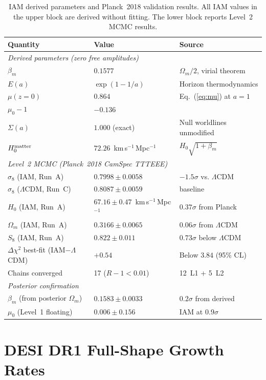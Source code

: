 \documentclass[12pt,a4paper]{article}
\newcommand{\lcdm}{$\Lambda$CDM}
\newcommand{\kms}{km\,s$^{-1}$\,Mpc$^{-1}$}
\newcommand{\Dchi}{\Delta\chi^2}
\begin{document}
\begin{table}[ht]
\centering
\caption{IAM derived parameters and Planck~2018 validation results.
All IAM values in the upper block are derived without fitting.
The lower block reports Level~2 MCMC results.}
\label{tab:params}
\begin{tabular}{lll}
\toprule
Quantity & Value & Source \\
\midrule
\multicolumn{3}{l}{\textit{Derived parameters (zero free amplitudes)}} \\
$\beta_m$ & $0.1577$ & $\Omega_m/2$, virial theorem \\
$E(a)$ & $\exp(1-1/a)$ & Horizon thermodynamics \\
$\mu(z=0)$ & $0.864$ & Eq.~(\ref{eq:mu}) at $a=1$ \\
$\mu_0 - 1$ & $-0.136$ & \\
$\Sigma(a)$ & $1.000$ (exact) & Null worldlines unmodified \\
$H_0^{\rm matter}$ & $72.26$~\kms{} & $H_0\sqrt{1+\beta_m}$ \\
\midrule
\multicolumn{3}{l}{\textit{Level~2 MCMC (Planck~2018 CamSpec TTTEEE)}} \\
$\sigma_8$ (IAM, Run~A) & $0.7998 \pm 0.0058$ & $-1.5\sigma$ vs. \lcdm \\
$\sigma_8$ (\lcdm, Run~C) & $0.8087 \pm 0.0059$ & baseline \\
$H_0$ (IAM, Run~A) & $67.16 \pm 0.47$~\kms{} & $0.37\sigma$ from Planck \\
$\Omega_m$ (IAM, Run~A) & $0.3166 \pm 0.0065$ & $0.06\sigma$ from \lcdm \\
$S_8$ (IAM, Run~A) & $0.822 \pm 0.011$ & $0.73\sigma$ below \lcdm \\
$\Dchi$ best-fit (IAM$-$\lcdm) & $+0.54$ & Below $3.84$ (95\% CL) \\
Chains converged & 17 ($R-1 < 0.01$) & 12~L1 + 5~L2 \\
\midrule
\multicolumn{3}{l}{\textit{Posterior confirmation}} \\
$\beta_m$ (from posterior $\Omega_m$) & $0.1583 \pm 0.0033$ & $0.2\sigma$ from derived \\
$\mu_0$ (Level~1 floating) & $0.006 \pm 0.156$ & IAM at $0.9\sigma$ \\
\bottomrule
\end{tabular}
\end{table}


\section{DESI DR1 Full-Shape Growth Rates}
\label{sec:desi_fsig8}
\end{document}

